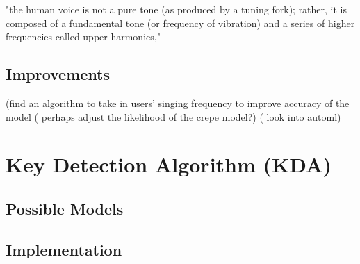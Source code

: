 "the human voice is not a pure tone (as produced by a tuning fork); rather, it is composed of a fundamental tone (or frequency of vibration) and a series of higher frequencies called upper harmonics," \cite{humanmono}

\subsection{Improvements}
(find an algorithm to take in users’ singing frequency to improve accuracy of the model ( perhaps adjust the likelihood of the crepe model?) ( look into automl)

\section{Key Detection Algorithm (KDA)}

\subsection{Possible Models}


\subsection{Implementation}
